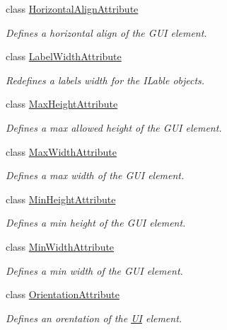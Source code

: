 \begin{DoxyCompactItemize}
class \mbox{\hyperlink{class_wpf_handler_1_1_u_i_1_1_auto_layout_1_1_options_1_1_horizontal_align_attribute}{Horizontal\+Align\+Attribute}}
\begin{DoxyCompactList}\small\item\em Defines a horizontal align of the G\+UI element. \end{DoxyCompactList}\item 
class \mbox{\hyperlink{class_wpf_handler_1_1_u_i_1_1_auto_layout_1_1_options_1_1_label_width_attribute}{Label\+Width\+Attribute}}
\begin{DoxyCompactList}\small\item\em Redefines a label\textquotesingle{}s width for the I\+Lable objects. \end{DoxyCompactList}\item 
class \mbox{\hyperlink{class_wpf_handler_1_1_u_i_1_1_auto_layout_1_1_options_1_1_max_height_attribute}{Max\+Height\+Attribute}}
\begin{DoxyCompactList}\small\item\em Defines a max allowed height of the G\+UI element. \end{DoxyCompactList}\item 
class \mbox{\hyperlink{class_wpf_handler_1_1_u_i_1_1_auto_layout_1_1_options_1_1_max_width_attribute}{Max\+Width\+Attribute}}
\begin{DoxyCompactList}\small\item\em Defines a max width of the G\+UI element. \end{DoxyCompactList}\item 
class \mbox{\hyperlink{class_wpf_handler_1_1_u_i_1_1_auto_layout_1_1_options_1_1_min_height_attribute}{Min\+Height\+Attribute}}
\begin{DoxyCompactList}\small\item\em Defines a min height of the G\+UI element. \end{DoxyCompactList}\item 
class \mbox{\hyperlink{class_wpf_handler_1_1_u_i_1_1_auto_layout_1_1_options_1_1_min_width_attribute}{Min\+Width\+Attribute}}
\begin{DoxyCompactList}\small\item\em Defines a min width of the G\+UI element. \end{DoxyCompactList}\item 
class \mbox{\hyperlink{class_wpf_handler_1_1_u_i_1_1_auto_layout_1_1_options_1_1_orientation_attribute}{Orientation\+Attribute}}
\begin{DoxyCompactList}\small\item\em Defines an orentation of the \mbox{\hyperlink{namespace_wpf_handler_1_1_u_i}{UI}} element. \end{DoxyCompactList}\item 

\end{DoxyCompactItemize}
